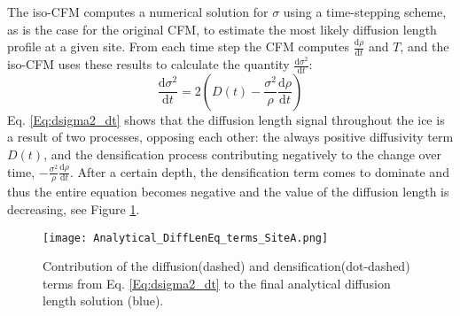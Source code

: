 \documentclass[../../CompleteThesis/Complete_1stDraft.tex]{subfiles}
\begin{document}
The iso-CFM computes a numerical solution for $\sigma$ using a time-stepping scheme, as is the case for the original CFM, to estimate the most likely diffusion length profile at a given site. From each time step the CFM computes $\frac{\text{d}\rho}{\text{d}t}$ and $T$, and the iso-CFM uses these results to calculate the quantity $\frac{\text{d}\sigma^2}{\text{d}t}$:
\begin{equation}
	\frac{\text{d}\sigma^2}{\text{d}t} = 2\left(D(t) - \frac{\sigma^2}{\rho}\frac{\text{d}\rho}{\text{d}t}\right)
	\label{Eq:dsigma2_dt}
\end{equation}
Eq. \ref{Eq:dsigma2_dt} shows that the diffusion length signal throughout the ice is a result of two processes, opposing each other: the always positive diffusivity term $D(t)$, and the densification process contributing negatively to the change over time, $-\frac{\sigma^2}{\rho}\frac{\text{d}\rho}{\text{d}t}$. After a certain depth, the densification term comes to dominate and thus the entire equation becomes negative and the value of the diffusion length is decreasing, see Figure \ref{Fig:ICE_DiffDensTerms}.

\begin{figure}
	\centering
	\texttt{[image: Analytical\_DiffLenEq\_terms\_SiteA.png]}
	\caption{Contribution of the diffusion(dashed) and densification(dot-dashed) terms from Eq. \ref{Eq:dsigma2_dt} to the final analytical diffusion length solution (blue).}
	\label{Fig:ICE_DiffDensTerms}
\end{figure}
\end{document}
